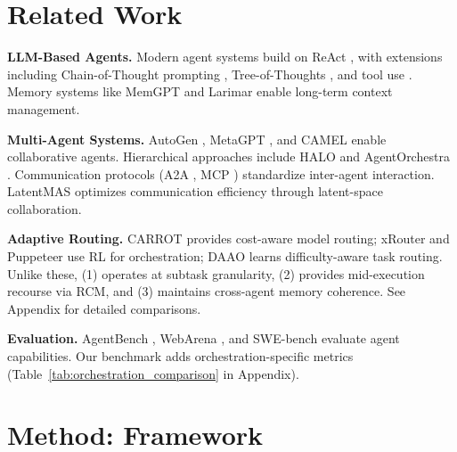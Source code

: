 \documentclass{article}
\theoremstyle{plain}
\theoremstyle{definition}
\theoremstyle{remark}
\begin{document}
\section{Related Work}
\label{sec:related}

\textbf{LLM-Based Agents.} Modern agent systems build on ReAct \citep{yao2023react}, with extensions including Chain-of-Thought prompting \citep{wei2022cot}, Tree-of-Thoughts \citep{yao2024tot}, and tool use \citep{schick2023toolformer,qin2024toolbench}. Memory systems like MemGPT \citep{packer2023memgpt} and Larimar \citep{das2024larimar} enable long-term context management.

\textbf{Multi-Agent Systems.} AutoGen \citep{wu2023autogen}, MetaGPT \citep{hong2024metagpt}, and CAMEL \citep{li2023camel} enable collaborative agents. Hierarchical approaches include HALO \citep{chen2025halo} and AgentOrchestra \citep{liu2025agentorchestra}. Communication protocols (A2A \citep{google2025a2a}, MCP \citep{anthropic2024mcp}) standardize inter-agent interaction. LatentMAS \citep{zou2025latent} optimizes communication efficiency through latent-space collaboration.

\textbf{Adaptive Routing.} CARROT \citep{chen2024carrot} provides cost-aware model routing; xRouter \citep{li2024xrouter} and Puppeteer \citep{zhang2024puppeteer} use RL for orchestration; DAAO \citep{chen2024daao} learns difficulty-aware task routing. Unlike these, \amore{} (1) operates at subtask granularity, (2) provides mid-execution recourse via RCM, and (3) maintains cross-agent memory coherence. See Appendix for detailed comparisons.

\textbf{Evaluation.} AgentBench \citep{liu2024agentbench}, WebArena \citep{zhou2024webarena}, and SWE-bench \citep{jimenez2024swebench} evaluate agent capabilities. Our \mars{} benchmark adds orchestration-specific metrics (Table~\ref{tab:orchestration_comparison} in Appendix).

\section{Method: \amore{} Framework}
\label{sec:method}
\end{document}
